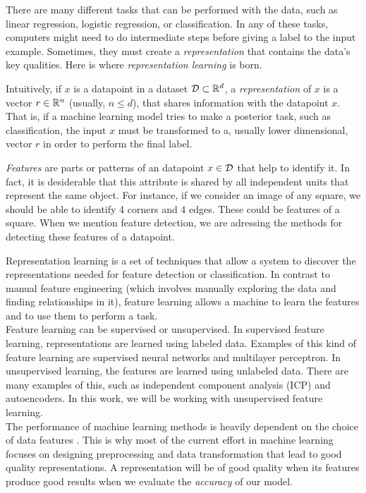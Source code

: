 There are many different tasks that can be performed with the data, such as linear regression, logistic regression, or classification. In any of these tasks, computers might need
to do intermediate steps before giving a label to the input example. Sometimes, they must create a \emph{representation} that 
contains the data's key qualities.  Here is where \emph{representation learning} is born. 


Intuitively, if $x$ is a datapoint in a dataset $\mathcal{D} \subset \mathbb{R}^d$, a \emph{representation} of $x$ is a vector $r \in \mathbb{R}^n$ (usually, $n \leq d$), that shares information with the datapoint $x$. That is, if a machine learning model
tries to make a posterior task, such as classification, the input $x$ must be transformed to a, usually lower dimensional, vector $r$ in order to perform the final label.

\emph{Features} are parts or patterns of an datapoint $x \in \mathcal{D}$ that help to identify it. In fact, it is desiderable that this attribute is shared by all independent units that represent the same object. For instance, if we consider an image of any square, we should be able to identify 4 corners and 4 edges. These could be features of a square.
When we mention feature detection, we are adressing the methods for detecting these features of a datapoint.

Representation learning is a set of techniques that allow a system to discover the representations needed for feature detection or classification. 
In contrast to manual feature engineering (which involves manually exploring the data and finding relationships in it), feature learning allows a machine to learn the features and to use them to perform a task.\\

Feature learning can be supervised or unsupervised. In supervised feature learning, representations are learned using labeled data.
Examples of this kind of feature learning are supervised neural networks and multilayer perceptron. In unsupervised learning, the features are learned using unlabeled data. 
There are many examples of this, such as independent component analysis (ICP) and autoencoders. In this work, we will be working with unsupervised feature learning.\\

The performance of machine learning methods is heavily dependent on the choice of data features \citep{bengio_representation_2014}. This is why most of the current 
effort in machine learning focuses on designing preprocessing and data transformation that lead to good quality representations. A representation will be of good quality when its features
produce good results when we evaluate the \emph{accuracy} of our model.\\

